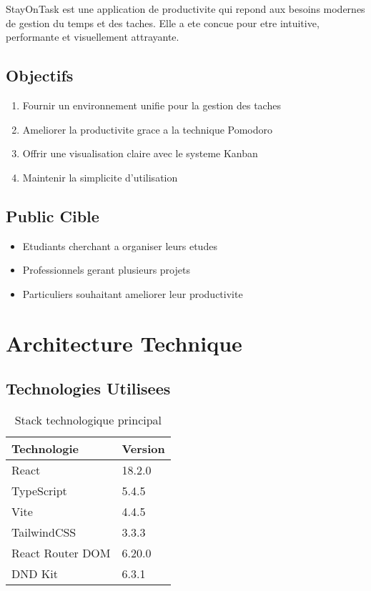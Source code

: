 \documentclass[12pt,a4paper]{article}
\begin{document}
StayOnTask est une application de productivite qui repond aux besoins modernes de gestion du temps et des taches. Elle a ete concue pour etre intuitive, performante et visuellement attrayante.

\subsection{Objectifs}

\begin{enumerate}
    \item Fournir un environnement unifie pour la gestion des taches
    \item Ameliorer la productivite grace a la technique Pomodoro
    \item Offrir une visualisation claire avec le systeme Kanban
    \item Maintenir la simplicite d'utilisation
\end{enumerate}

\subsection{Public Cible}

\begin{itemize}
    \item Etudiants cherchant a organiser leurs etudes
    \item Professionnels gerant plusieurs projets
    \item Particuliers souhaitant ameliorer leur productivite
\end{itemize}

\section{Architecture Technique}

\subsection{Technologies Utilisees}

\begin{table}[H]
\centering
\begin{tabular}{|l|l|}
\hline
\textbf{Technologie} & \textbf{Version} \\
\hline
React & 18.2.0 \\
TypeScript & 5.4.5 \\
Vite & 4.4.5 \\
TailwindCSS & 3.3.3 \\
React Router DOM & 6.20.0 \\
DND Kit & 6.3.1 \\
\hline
\end{tabular}
\caption{Stack technologique principal}
\label{tab:tech-stack}
\end{table}
\end{document}
